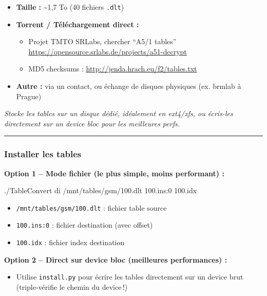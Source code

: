 \documentclass[
  french,
]{article}
\newenvironment{Shaded}{\begin{snugshade}}{\end{snugshade}}
\newcommand{\ExtensionTok}[1]{#1}
\newcommand{\NormalTok}[1]{#1}
\providecommand{\tightlist}{%
  \setlength{\itemsep}{0pt}\setlength{\parskip}{0pt}}
\begin{document}
\begin{itemize}
\item
  \textbf{Taille :} \textasciitilde1,7 To (40 fichiers \texttt{.dlt})
\item
  \textbf{Torrent / Téléchargement direct :}

  \begin{itemize}
  \tightlist
  \item
    Projet TMTO SRLabs, chercher ``A5/1 tables''
    \url{https://opensource.srlabs.de/projects/a51-decrypt}
  \item
    MD5 checksums : \url{http://jenda.hrach.eu/f2/tables.txt}
  \end{itemize}
\item
  \textbf{Autre :} via un contact, ou échange de disques physiques (ex.
  brmlab à Prague)
\end{itemize}

\emph{Stocke les tables sur un disque dédié, idéalement en ext4/xfs, ou
écris-les directement sur un device bloc pour les meilleures perfs.}

\begin{center}\rule{0.5\linewidth}{0.5pt}\end{center}

\subsubsection{Installer les tables}\label{installer-les-tables}

\textbf{Option 1 -- Mode fichier (le plus simple, moins performant) :}

\begin{Shaded}
\begin{Highlighting}[]
\ExtensionTok{./TableConvert}\NormalTok{ di /mnt/tables/gsm/100.dlt 100.ins:0 100.idx}
\end{Highlighting}
\end{Shaded}

\begin{itemize}
\tightlist
\item
  \texttt{/mnt/tables/gsm/100.dlt} : fichier table source
\item
  \texttt{100.ins:0} : fichier destination (avec offset)
\item
  \texttt{100.idx} : fichier index destination
\end{itemize}

\textbf{Option 2 -- Direct sur device bloc (meilleures performances) :}

\begin{itemize}
\tightlist
\item
  Utilise \texttt{install.py} pour écrire les tables directement sur un
  device brut (triple-vérifie le chemin du device\,!)
\end{itemize}
\end{document}
